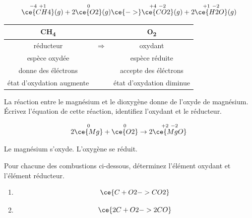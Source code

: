 \documentclass[
  11pt,
  a4paper,
  openany]{book}
\providecommand{\tightlist}{%
  \setlength{\itemsep}{0pt}\setlength{\parskip}{0pt}}
\begin{document}
\clearpage

\[
\overset{-4\ +1}{\ce{CH4}}(g) + 2\overset{0}{\ce{O2}}(g) \ce{->} \overset{+4\ -2}{\ce{CO2}}(g) + 2\overset{+1\ -2}{\ce{H2O}}(g)
\]

\begin{longtable}[]{@{}ccc@{}}
\toprule\noalign{}
CH\textsubscript{4} & & O\textsubscript{2} \\
\midrule\noalign{}
\endhead
\bottomrule\noalign{}
\endlastfoot
réducteur & \(\Rightarrow\) & oxydant \\
espèce oxydée & & espèce réduite \\
donne des éléctrons & & accepte des éléctrons \\
état d'oxydation augmente & & état d'oxydation diminue \\
\end{longtable}

\begin{Exercise}

La réaction entre le magnésium et le dioxygène donne de l'oxyde de magnésium. Écrivez l'équation de cette réaction, identifiez l'oxydant et le réducteur.


\end{Exercise}

\begin{Answer}
\[
2 \overset{0}{\ce{Mg}} + \overset{0}{\ce{O2}} \rightarrow 2 \overset{+2\ -2}{\ce{MgO}}
\]

Le magnésium s'oxyde. L'oxygène se réduit.

\end{Answer}

\begin{Exercise}

Pour chacune des combustions ci-dessous, déterminez l'élément oxydant et l'élément réducteur.

\begin{enumerate}
\def\labelenumi{\alph{enumi}.}
\tightlist
\item
  \[
  \ce{C + O2 -> CO2}
  \]
\item
  \[
  \ce{2C + O2 -> 2CO}
  \]
\end{enumerate}

\end{Exercise}
\end{document}
